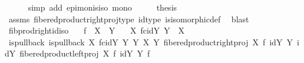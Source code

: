 \begin{isabellebody}
\ \ \ \ \isamarkupfalse%
\ {\isacharparenleft}{\kern0pt}simp\ add{\isacharcolon}{\kern0pt}\ epi{\isacharunderscore}{\kern0pt}mon{\isacharunderscore}{\kern0pt}is{\isacharunderscore}{\kern0pt}iso\ mono{\isacharparenright}{\kern0pt}\isanewline
\ \ \isamarkupfalse%
\ \isamarkupfalse%
\ {\isacharquery}{\kern0pt}thesis\isanewline
\ \ \ \ \isamarkupfalse%
\ assms\ fibered{\isacharunderscore}{\kern0pt}product{\isacharunderscore}{\kern0pt}right{\isacharunderscore}{\kern0pt}proj{\isacharunderscore}{\kern0pt}type\ id{\isacharunderscore}{\kern0pt}type\ is{\isacharunderscore}{\kern0pt}isomorphic{\isacharunderscore}{\kern0pt}def\ \isamarkupfalse%
\ blast\isanewline
{}\isamarkupfalse%
%
\endisatagproof
{\isafoldproof}%
%
\isadelimproof
\isanewline
%
\endisadelimproof
\isanewline
{}\isamarkupfalse%
\ fib{\isacharunderscore}{\kern0pt}prod{\isacharunderscore}{\kern0pt}right{\isacharunderscore}{\kern0pt}id{\isacharunderscore}{\kern0pt}iso{\isacharcolon}{\kern0pt}\isanewline
\ \ \ {\isachardoublequoteopen}f\ {\isacharcolon}{\kern0pt}\ X\ {\isasymrightarrow}\ Y{\isachardoublequoteclose}\isanewline
\ \ \ {\isachardoublequoteopen}{\isacharparenleft}{\kern0pt}X\ \isactrlbsub f\isactrlesub {\isasymtimes}\isactrlsub c\isactrlbsub id{\isacharparenleft}{\kern0pt}Y{\isacharparenright}{\kern0pt}\isactrlesub \ Y{\isacharparenright}{\kern0pt}\ {\isasymcong}\ X{\isachardoublequoteclose}\isanewline
%
\isadelimproof
%
\endisadelimproof
%
\isatagproof
{}\isamarkupfalse%
\ {\isacharminus}{\kern0pt}\ \isanewline
\ \ \isamarkupfalse%
\ is{\isacharunderscore}{\kern0pt}pullback{\isacharcolon}{\kern0pt}\ {\isachardoublequoteopen}is{\isacharunderscore}{\kern0pt}pullback\ {\isacharparenleft}{\kern0pt}X\ \isactrlbsub f\isactrlesub {\isasymtimes}\isactrlsub c\isactrlbsub id{\isacharparenleft}{\kern0pt}Y{\isacharparenright}{\kern0pt}\isactrlesub \ Y{\isacharparenright}{\kern0pt}\ Y\ X\ Y\ {\isacharparenleft}{\kern0pt}fibered{\isacharunderscore}{\kern0pt}product{\isacharunderscore}{\kern0pt}right{\isacharunderscore}{\kern0pt}proj\ X\ f\ {\isacharparenleft}{\kern0pt}id{\isacharparenleft}{\kern0pt}Y{\isacharparenright}{\kern0pt}{\isacharparenright}{\kern0pt}\ Y{\isacharparenright}{\kern0pt}\ {\isacharparenleft}{\kern0pt}id{\isacharparenleft}{\kern0pt}Y{\isacharparenright}{\kern0pt}{\isacharparenright}{\kern0pt}\ {\isacharparenleft}{\kern0pt}fibered{\isacharunderscore}{\kern0pt}product{\isacharunderscore}{\kern0pt}left{\isacharunderscore}{\kern0pt}proj\ X\ f\ {\isacharparenleft}{\kern0pt}id{\isacharparenleft}{\kern0pt}Y{\isacharparenright}{\kern0pt}{\isacharparenright}{\kern0pt}\ Y{\isacharparenright}{\kern0pt}\ f\ {\isachardoublequoteclose}\isanewline

\end{isabellebody}
